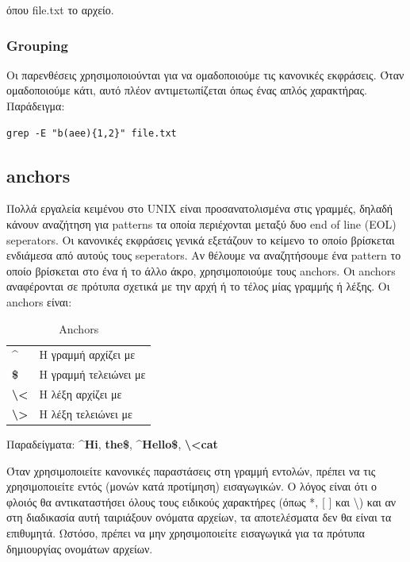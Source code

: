 όπου file.txt το αρχείο.

\subsubsection{Grouping}
Οι παρενθέσεις χρησιμοποιούνται για να ομαδοποιούμε τις κανονικές εκφράσεις. Όταν ομαδοποιούμε κάτι, αυτό πλέον αντιμετωπίζεται όπως ένας απλός χαρακτήρας.
Παράδειγμα:\\
\begin{lstlisting}
grep -E "b(aee){1,2}" file.txt
\end{lstlisting}



\subsection{anchors} 
Πολλά εργαλεία κειμένου στο UNIX είναι προσανατολισμένα στις γραμμές, δηλαδή κάνουν αναζήτηση για patterns τα οποία περιέχονται μεταξύ δυο
end of line (EOL) seperators. Οι κανονικές εκφράσεις γενικά εξετάζουν το κείμενο το οποίο βρίσκεται ενδιάμεσα από αυτούς τους seperators. Αν
θέλουμε να αναζητήσουμε ένα pattern το οποίο βρίσκεται στο ένα ή το άλλο άκρο, χρησιμοποιούμε τους anchors.
Οι anchors αναφέρονται σε πρότυπα σχετικά με την αρχή ή το τέλος μίας γραμμής ή λέξης. Οι anchors είναι:


\begin{table}[h]
	\begin{tabularx}{\columnwidth}{l|X}
		\textbf{\^{ }} & Η γραμμή αρχίζει με \\
		\textbf{\$}	& Η γραμμή τελειώνει με \\
		\textbf{\textbackslash<}& Η λέξη αρχίζει με  \\
		\textbf{\textbackslash>}& Η λέξη τελειώνει με \\
		
	\end{tabularx}  
	\caption{Anchors}
\end{table}

Παραδείγματα: \textbf{\^{}Hi}, \textbf{the\$}, \textbf{\^{}Hello\$}, \textbf{\textbackslash<cat}

Όταν χρησιμοποιείτε κανονικές παραστάσεις στη γραμμή εντολών, πρέπει να τις  χρησιμοποιείτε εντός (μονών κατά προτίμηση) εισαγωγικών. Ο
λόγος είναι ότι ο φλοιός θα αντικαταστήσει όλους τους ειδικούς χαρακτήρες (όπως *, [ ] και \textbackslash) και αν στη διαδικασία αυτή
ταιριάξουν ονόματα αρχείων, τα αποτελέσματα δεν θα είναι τα επιθυμητά. Ωστόσο, πρέπει να μην χρησιμοποιείτε εισαγωγικά για τα πρότυπα
δημιουργίας ονομάτων αρχείων. 


